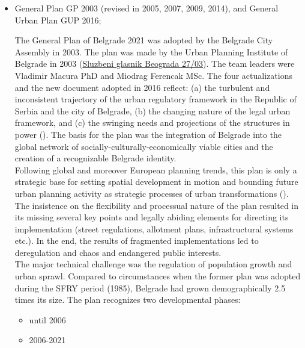 \documentclass[11pt]{report}
\begin{document}
\begin{itemize}
\item General Plan GP 2003 (revised in 2005, 2007, 2009, 2014), and General Urban Plan GUP 2016;

The  General  Plan  of  Belgrade  2021 was adopted  by the Belgrade  City Assembly in 2003.
The plan was made by  the  Urban  Planning  Institute  of  Belgrade  in  2003 (\href{ref}{Sluzbeni glasnik Beograda 27/03}). The team leaders were Vladimir Macura PhD and Miodrag Ferencak MSc. The four actualizations and the new document adopted in 2016 reflect: (a) the turbulent and inconsistent trajectory of the urban regulatory framework in the Republic of Serbia and the city of Belgrade, (b) the changing nature of the legal urban framework, and (c) the swinging needs and projections of the structures in power 
(\href{Vukmirovic}{\citealt{doytchinov_belgrade:_2015}}).
The basis for the plan was the integration of Belgrade into the global network of socially-culturally-economically viable cities and the creation of a recognizable Belgrade identity.
\\

Following global and moreover European planning trends, this plan is only a  strategic base for setting spatial development in motion and bounding future urban planning activity as strategic processes of urban transformations (\href{Grozdanic}{\citealt{grozdanic_belgrade_2008}}).
The insistence on the flexibility and processual nature of the plan resulted in its missing several key points and legally abiding elements for directing its implementation (street regulations,  allotment plans, infrastructural systems etc.).
In the end, the results of fragmented implementations led to deregulation and chaos and endangered public interests.
\\
The major technical challenge was the regulation of population growth and urban sprawl. Compared to circumstances when the former plan was adopted during the SFRY period (1985), Belgrade had grown demographically 2.5 times its size.
The plan recognizes two developmental phases:

\begin{itemize}
\item until 2006
\item 2006-2021
\end{itemize}


\end{itemize}
\end{document}
